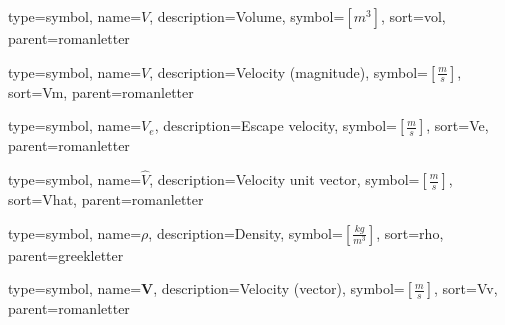 {
	type=symbol, %
	name={\ensuremath{\mathit{V}}}, %
	description={Volume}, %
	symbol={$\left[m^{3}\right]$}, %
	sort=vol, %
	parent=romanletter %
}

{
type=symbol, %
name={\ensuremath{V}}, %
description={Velocity (magnitude)}, %
symbol={$\left[\frac{m}{s}\right]$}, %
sort=Vm, %
parent=romanletter %
}

{
type=symbol, %
name={\ensuremath{V_e}}, %
description={Escape velocity}, %
symbol={$\left[\frac{m}{s}\right]$}, %
sort=Ve, %
parent=romanletter %
}

{
	type=symbol, %
	name={\ensuremath{\hat{V}}}, %
	description={Velocity unit vector}, %
	symbol={$\left[\frac{m}{s}\right]$}, %
	sort=Vhat, %
	parent=romanletter %
}

{
type=symbol, %
name={\ensuremath{\rho}}, %
description={Density}, %
symbol={$\left[\frac{kg}{m^3}\right]$}, %
sort=rho, %
parent=greekletter %
}

{
type=symbol, %
name={\ensuremath{\mathbf{V}}}, %
description={Velocity (vector)}, %
symbol={$\left[\frac{m}{s}\right]$}, %
sort=Vv, %
parent=romanletter %
}

